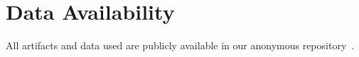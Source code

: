 \documentclass[conference]{IEEEtran}
\begin{document}

\section{Data Availability} All artifacts and data used are publicly available in our anonymous repository~\cite{morph-artifact-anon}.



 
\end{document}
